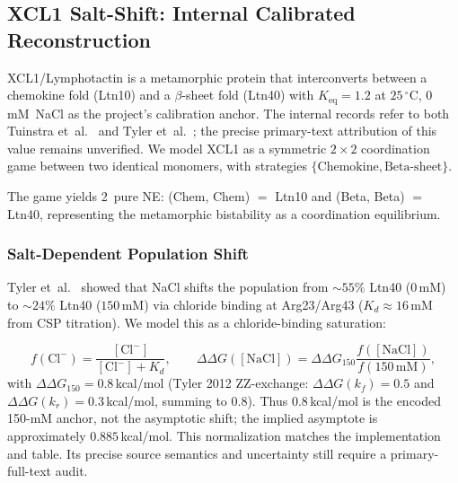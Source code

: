 \documentclass[12pt,a4paper]{article}
\begin{document}
\subsection{XCL1 Salt-Shift: Internal Calibrated Reconstruction}
\label{sec:xcl1}

XCL1/Lymphotactin is a metamorphic protein that interconverts between a
chemokine fold (Ltn10) and a $\beta$-sheet fold (Ltn40) with
$K_\text{eq} = 1.2$ at $25\,{}^\circ\text{C}$, $0$\,mM~NaCl as the
project's calibration anchor. The internal records refer to both
Tuinstra et~al.~\cite{Tuinstra2008} and Tyler et~al.~\cite{Tyler2012};
the precise primary-text attribution of this value remains unverified. We model XCL1 as a symmetric $2\times 2$
coordination game between two identical monomers, with strategies
$\{\text{Chemokine}, \text{Beta-sheet}\}$.

The game yields 2~pure NE: (Chem, Chem) $=$ Ltn10 and
(Beta, Beta) $=$ Ltn40, representing the metamorphic bistability as a
coordination equilibrium.

\subsubsection{Salt-Dependent Population Shift}

Tyler et~al.~\cite{Tyler2012} showed that NaCl shifts the population
from ${\sim}55\%$ Ltn40 ($0$\,mM) to ${\sim}24\%$ Ltn40 ($150$\,mM) via
chloride binding at Arg23/Arg43 ($K_d \approx 16$\,mM from CSP
titration). We model this as a chloride-binding saturation:

\begin{equation}
  f(\text{Cl}^-) = \frac{[\text{Cl}^-]}{[\text{Cl}^-] + K_d}, \qquad
  \Delta\Delta G([\text{NaCl}])
  = \Delta\Delta G_{150}
    \frac{f([\text{NaCl}])}{f(150\,\text{mM})},
  \label{eq:salt_model}
\end{equation}
with $\Delta\Delta G_{150} = 0.8$\,kcal/mol (Tyler 2012 ZZ-exchange:
$\Delta\Delta G(k_f)=0.5$ and $\Delta\Delta G(k_r)=0.3$\,kcal/mol,
summing to $0.8$).
Thus $0.8$\,kcal/mol is the encoded 150-mM anchor, not the asymptotic
shift; the implied asymptote is approximately $0.885$\,kcal/mol. This
normalization matches the implementation and table. Its precise source
semantics and uncertainty still require a primary-full-text audit.
\end{document}

